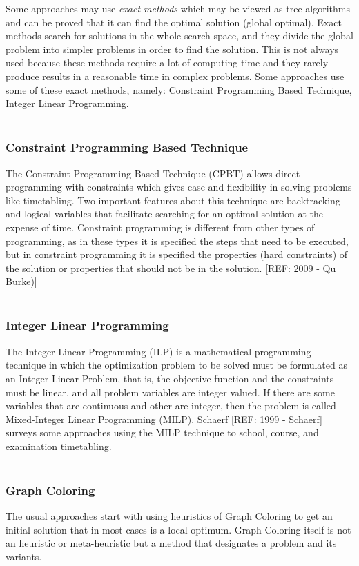 Some approaches may use \textit{exact methods} which may be viewed as tree algorithms and can be proved that it can find the optimal solution (global optimal). Exact methods search for solutions in the whole search space, and they divide the global problem into simpler problems in order to find the solution. This is not always used because these methods require a lot of computing time and they rarely produce results in a reasonable time in complex problems. Some approaches use some of these exact methods, namely: Constraint Programming Based Technique, Integer Linear Programming.\\
\\
\subsubsection{Constraint Programming Based Technique}
\label{subsection:CPBT}
The Constraint Programming Based Technique (CPBT) allows direct programming with constraints which gives ease and flexibility in solving problems like timetabling. Two important features about this technique are backtracking and logical variables that facilitate searching for an optimal solution at the expense of time. Constraint programming is different from other types of programming, as in these types it is specified the steps that need to be executed, but in constraint programming it is specified the properties (hard constraints) of the solution or properties that should not be in the solution. [REF: 2009 - Qu Burke)]\\
\\
\subsubsection{Integer Linear Programming}
\label{subsection:ILP}
The Integer Linear Programming (ILP) is a mathematical programming technique in which the optimization problem to be solved must be formulated as an Integer Linear Problem, that is, the objective function and the constraints must be linear, and all problem variables are integer valued. If there are some variables that are continuous and other are integer, then the problem is called Mixed-Integer Linear Programming (MILP). Schaerf [REF: 1999 - Schaerf] surveys some approaches using the MILP technique to school, course, and examination timetabling.\\
\\
\subsubsection{Graph Coloring}
The usual approaches start with using heuristics of Graph Coloring to get an initial solution that in most cases is a local optimum. Graph Coloring itself is not an heuristic or meta-heuristic but a method that designates a problem and its variants.\\
